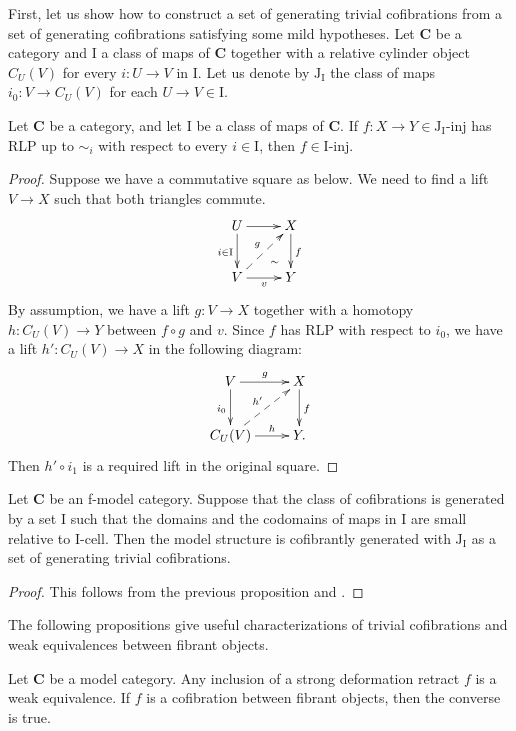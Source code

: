 \documentclass{amsart}
\theoremstyle{definition}
\newcommand{\cat}[1]{\mathbf{#1}}
\newcommand{\C}{\cat{C}}
\newcommand{\I}{\mathrm{I}}
\newcommand{\J}{\mathrm{J}}
\newcommand{\class}[2]{#1\text{-}\mathrm{#2}}
\newcommand{\Iinj}[1][\I]{\class{#1}{inj}}
\newcommand{\Icell}[1][\I]{\class{#1}{cell}}
\newcommand{\Jinj}[1][]{\Iinj[\J#1]}
\newcommand{\cyli}{i}
\begin{document}
First, let us show how to construct a set of generating trivial cofibrations from a set of generating cofibrations satisfying some mild hypotheses.
Let $\C$ be a category and $\I$ a class of maps of $\C$ together with a relative cylinder object $C_U(V)$ for every $i : U \to V$ in $\I$.
Let us denote by $\J_\I$ the class of maps $\cyli_0 : V \to C_U(V)$ for each $U \to V \in \I$.

\begin{prop}
Let $\C$ be a category, and let $\I$ be a class of maps of $\C$.
If $f : X \to Y \in \Jinj[_\I]$ has RLP up to $\sim_i$ with respect to every $i \in \I$, then $f \in \Iinj$.
\end{prop}
\begin{proof}
Suppose we have a commutative square as below.
We need to find a lift $V \to X$ such that both triangles commute.
\[ \xymatrix{ U \ar[d]_{i \in \I} \ar[r] \ar@{}[dr]|(.7){\sim} & X \ar[d]^f \\
              V \ar[r]_v \ar@{-->}[ur]^g                       & Y
            } \]
By assumption, we have a lift $g : V \to X$ together with
a homotopy $h : C_U(V) \to Y$ between $f \circ g$ and $v$.
Since $f$ has RLP with respect to $\cyli_0$, we have a lift $h' : C_U(V) \to X$ in the following diagram:
\[ \xymatrix{ V \ar[r]^g \ar[d]_{\cyli_0}         & X \ar[d]^f \\
              C_U(V) \ar[r]^-h \ar@{-->}[ur]^{h'} & Y.
            } \]
Then $h' \circ \cyli_1$ is a required lift in the original square.
\end{proof}

\begin{cor}
Let $\C$ be an f-model category.
Suppose that the class of cofibrations is generated by a set $\I$ such that
the domains and the codomains of maps in $\I$ are small relative to $\Icell$.
Then the model structure is cofibrantly generated with $\J_\I$ as a set of generating trivial cofibrations.
\end{cor}
\begin{proof}
This follows from the previous proposition and .
\end{proof}

The following propositions give useful characterizations of trivial
cofibrations and weak equivalences between fibrant objects.

\begin{prop}
Let $\C$ be a model category.
Any inclusion of a strong deformation retract $f$ is a weak equivalence.
If $f$ is a cofibration between fibrant objects, then the converse is true.
\end{prop}
\end{document}

